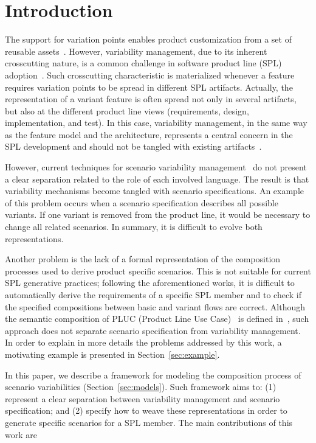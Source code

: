 \documentclass{acm_proc_article-sp}
\begin{document}

%
\section{Introduction}
%
The support for variation points enables product
customization from a set of reusable
assets~\cite{phol-spl-book}. However, variability management, due to
its inherent crosscutting nature, is a common challenge in software
product line (SPL) adoption~\cite{northrop-spl-book,phol-spl-book}.
Such crosscutting characteristic is materialized whenever a feature
requires variation points to be spread in different SPL artifacts. Actually, 
the representation of a variant feature is often spread not only 
in several artifacts, but also at the different product line views (requirements, 
design, implementation, and test). In this case, variability management, in 
the same way as the feature model and the architecture, represents a central concern in the SPL 
development and should not be tangled with existing artifacts~\cite{phol-spl-book}.   

However, current techniques for scenario variability 
management~\cite{favaro-icsr-98,bertolino-esec-2003,eriksson-splc-2005} do 
not present a clear separation related to the role of each involved language. 
The result is that variability mechanisms become tangled with scenario specifications. 
An example of this problem occurs when a scenario specification describes all possible variants. 
If one variant is removed from the product line, it would be necessary to change all related scenarios. 
In summary, it is difficult to evolve both representations. 

Another problem is the lack of a formal representation of the composition processes used 
to derive product specific scenarios. This is not suitable for current SPL generative 
practices; following the aforementioned works, it is difficult to automatically derive 
the requirements of a specific SPL member and to check if the specified compositions 
between basic and variant flows are correct.  Although  the semantic composition of PLUC (Product 
Line Use Case)~\cite{bertolino-esec-2003} is defined in~\cite{fantechi-splc-2004}, such approach 
does not separate scenario specification from variability management. In order to explain in more details 
the problems addressed by this work, a motivating example is presented  in Section~\ref{sec:example}.  

In this paper, we describe a framework for modeling the composition 
process of scenario variabilities (Section~\ref{sec:models}). 
Such framework aims to: (1) represent a clear separation between variability management 
and scenario specification; and (2) specify how to weave these representations in order to generate
specific scenarios for a SPL member. The main contributions of this work are
\end{document}
